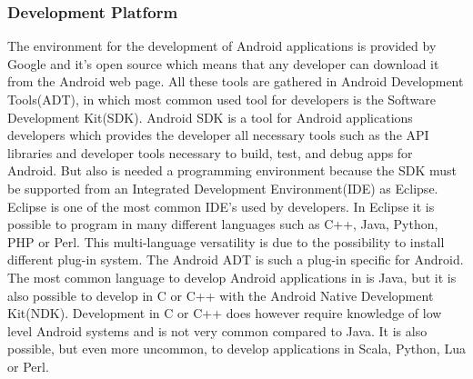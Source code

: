\subsubsection{Development Platform}
The environment for the development of Android applications is provided by Google and it's open source which means that any developer can download it from the Android web page. All these tools are gathered in Android Development Tools(ADT)\cite{android-adt}, in which most common used tool for developers is the Software Development Kit(SDK)\cite{android-sdk}.
Android SDK is a tool for Android applications developers which provides the developer all necessary tools such as the API libraries and developer tools necessary to build, test, and debug apps for Android. But also is needed a programming environment because the SDK must be supported from an Integrated Development Environment(IDE) as Eclipse.
Eclipse is one of the most common IDE’s used by developers. In Eclipse it is possible to program in many different languages such as C++, Java, Python, PHP or Perl. This multi-language versatility is due to the possibility to install different plug-in system. The Android ADT is such a plug-in specific for Android.
The most common language to develop Android applications in is Java, but it is also possible to develop in C or C++ with the Android Native Development Kit(NDK)\cite{android-ndk}. Development in C or C++ does however require knowledge of low level Android systems and is not very common compared to Java. It is also possible, but even more uncommon, to develop applications in  Scala, Python, Lua or Perl.


